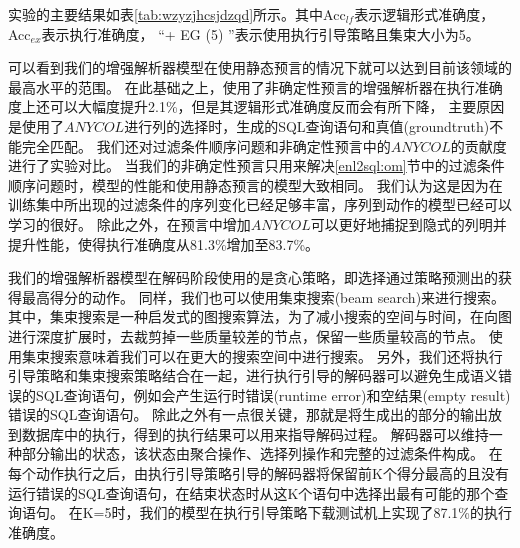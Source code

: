 \begin{table}[!htpb]
\begin{threeparttable}[b]
\begin{tabular}{lcccc}
      \bottomrule
    \end{tabular}
  \end{threeparttable}
\end{table}

实验的主要结果如表\ref{tab:wzyzjhcsjdzqd}所示。其中Acc$_{lf}$表示逻辑形式准确度，Acc$_{ex}$表示执行准确度，
“+ EG (5) ”表示使用执行引导策略且集束大小为5。

可以看到我们的增强解析器模型在使用静态预言的情况下就可以达到目前该领域的最高水平\cite{dong2018coarse}的范围。
在此基础之上，使用了非确定性预言的增强解析器在执行准确度上还可以大幅度提升2.1\%，但是其逻辑形式准确度反而会有所下降，
主要原因是使用了$ANYCOL$进行列的选择时，生成的SQL查询语句和真值(groundtruth)不能完全匹配。
我们还对过滤条件顺序问题和非确定性预言中的$ANYCOL$的贡献度进行了实验对比。
当我们的非确定性预言只用来解决\ref{enl2sql:om}节中的过滤条件顺序问题时，模型的性能和使用静态预言的模型大致相同。
我们认为这是因为在训练集中所出现的过滤条件的序列变化已经足够丰富，序列到动作的模型已经可以学习的很好。
除此之外，在预言中增加$ANYCOL$可以更好地捕捉到隐式的列明并提升性能，使得执行准确度从81.3\%增加至83.7\%。

我们的增强解析器模型在解码阶段使用的是贪心策略，即选择通过策略预测出的获得最高得分的动作。
同样，我们也可以使用集束搜索(beam search)来进行搜索。
其中，集束搜索是一种启发式的图搜索算法，为了减小搜索的空间与时间，在向图进行深度扩展时，去裁剪掉一些质量较差的节点，保留一些质量较高的节点。
使用集束搜索意味着我们可以在更大的搜索空间中进行搜索。
另外，我们还将执行引导策略和集束搜索策略结合在一起，进行执行引导的解码器可以避免生成语义错误的SQL查询语句，例如会产生运行时错误(runtime error)和空结果(empty result)错误的SQL查询语句。
除此之外有一点很关键，那就是将生成出的部分的输出放到数据库中的执行，得到的执行结果可以用来指导解码过程。
解码器可以维持一种部分输出的状态，该状态由聚合操作、选择列操作和完整的过滤条件构成。
在每个动作执行之后，由执行引导策略引导的解码器将保留前K个得分最高的且没有运行错误的SQL查询语句，在结束状态时从这K个语句中选择出最有可能的那个查询语句。
在K=5时，我们的模型在执行引导策略下载测试机上实现了87.1\%的执行准确度。

